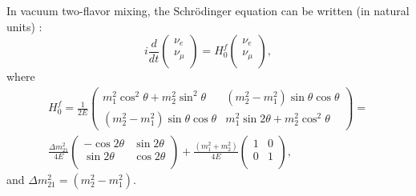In vacuum two-flavor mixing, the Schr\"{o}dinger equation can be written (in natural units) \cite{xing2011neutrinos}:
\begin{equation}\label{eq:2flavor_simple}
	i\frac{d}{dt}\begin{pmatrix}
		\nu_e\\
		\nu_\mu\\
	\end{pmatrix}
	=
	H^f_0
	\begin{pmatrix}
		\nu_e\\
		\nu_\mu\\
	\end{pmatrix},
\end{equation}
where
\begin{equation} \label{eq:H0f}
\begin{aligned}
 H^f_0 = \frac{1}{2E}\begin{pmatrix}m^2_1\cos^2\theta+m^2_2\sin^2\theta & (m^2_2-m^2_1)\sin\theta\cos\theta \\ (m^2_2-m^2_1)\sin\theta\cos\theta & m^2_1\sin2\theta+m^2_2\cos^2\theta\end{pmatrix} =
\\
\frac{\Delta m_{21}^2}{4E}\begin{pmatrix}
	-\cos 2\theta & \sin 2\theta\\
	\sin 2\theta & \cos 2\theta\\
\end{pmatrix}+\frac{(m_1^2+m_2^2)}{4E}\begin{pmatrix}
	1 & 0\\
	0 &1\\
\end{pmatrix},
\end{aligned}
\end{equation}
and $\Delta m^2_{21}=(m^2_2 - m^2_1)$.

